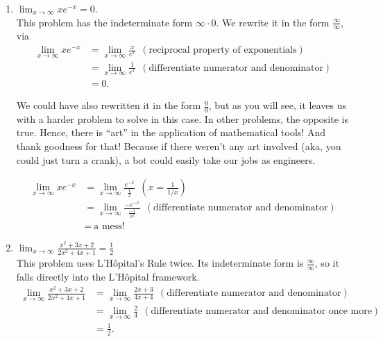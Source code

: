 \begin{enumerate}
\renewcommand{\labelenumi}{(\alph{enumi})}
\setlength{\itemsep}{.2cm}

    \item \Ans $\displaystyle \lim_{{x \to \infty}} x e^{-x} =0$.\\

    This problem has the indeterminate form $\infty \cdot 0$. We rewrite it in the form $\frac{\infty}{\infty}$, via
 \begin{align*}
     \lim_{{x \to \infty}} x e^{-x} &= \lim_{{x \to \infty}} \frac{x}{e^{x}} ~~ (\text{reciprocal property of exponentials})\\
     &=  \lim_{{x \to \infty}} \frac{1}{e^{x}}~~(\text{differentiate numerator and denominator})\\
     &= 0.
 \end{align*}

    We could have also rewritten it in the form  $\frac{0}{0}$, but as you will see, it leaves us with a harder problem to solve in this case. In other problems, the opposite is true. Hence, there is ``art'' in the application of mathematical tools! And thank goodness for that! Because if there weren't any art involved (aka, you could just turn a crank), a bot could easily take our jobs as engineers.

   \begin{align*}
     \lim_{{x \to \infty}} x e^{-x} &= \lim_{{x \to \infty}} \frac{e^{-x}}{\frac{1}{x}} ~~ (x = \frac{1}{1/x})\\
     &=  \lim_{{x \to \infty}} \frac{-e^{-x}}{\frac{-1}{x^2}}~~(\text{differentiate numerator and denominator})\\
     &= ~\text{a mess!}
 \end{align*}  

    
   
    \item \Ans $\displaystyle \lim_{{x \to \infty}} \frac{x^2 + 3x + 2}{2x^2 + 4x + 1} = \frac{1}{2}$\\

    This problem uses L'H\^opital's Rule twice. Its indeterminate form is $\frac{\infty}{\infty}$, so it falls directly into the L'H\^opital framework.
\begin{align*}
     \lim_{{x \to \infty}} \frac{x^2 + 3x + 2}{2x^2 + 4x + 1} &=   \lim_{{x \to \infty}} \frac{2x+3}{4x + 4}~~ (\text{differentiate numerator and denominator})\\
     &=  \lim_{{x \to \infty}} \frac{2}{4}~~(\text{differentiate numerator and denominator once more})\\
     &= \frac{1}{2}.
\end{align*}



\end{enumerate}
